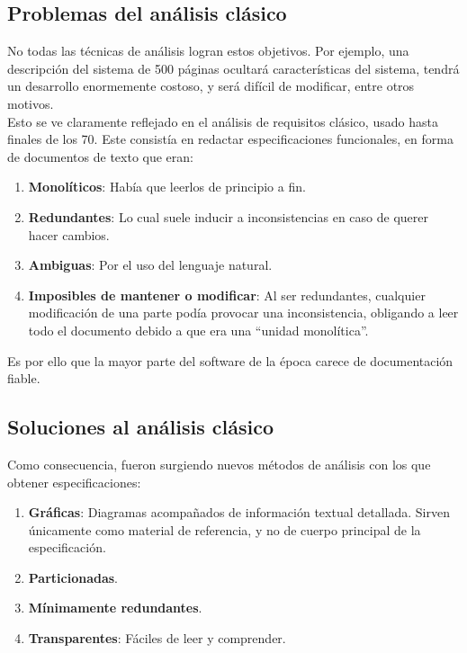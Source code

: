 \subsection{Problemas del análisis clásico}

No todas las técnicas de análisis logran estos objetivos. Por ejemplo, una descripción del sistema de 500 páginas ocultará características del sistema, tendrá un desarrollo enormemente costoso, y será difícil de modificar, entre otros motivos.\\

Esto se ve claramente reflejado en el análisis de requisitos clásico, usado hasta finales de los 70. Este consistía en redactar especificaciones funcionales, en forma de documentos de texto que eran:

\begin{enumerate}
    \item \textbf{Monolíticos}: Había que leerlos de principio a fin.
    \item \textbf{Redundantes}: Lo cual suele inducir a inconsistencias en caso de querer hacer cambios.
    \item \textbf{Ambiguas}: Por el uso del lenguaje natural.
    \item \textbf{Imposibles de mantener o modificar}: Al ser redundantes, cualquier modificación de una parte podía provocar una inconsistencia, obligando a leer todo el documento debido a que era una ``unidad monolítica''.
\end{enumerate}

Es por ello que la mayor parte del software de la época carece de documentación fiable.

\subsection{Soluciones al análisis clásico}

Como consecuencia, fueron surgiendo nuevos métodos de análisis con los que obtener especificaciones:

\begin{enumerate}
    \item \textbf{Gráficas}: Diagramas acompañados de información textual detallada. Sirven únicamente como material de referencia, y no de cuerpo principal de la especificación.
    \item \textbf{Particionadas}.
    \item \textbf{Mínimamente redundantes}.
    \item \textbf{Transparentes}: Fáciles de leer y comprender.
\end{enumerate}

